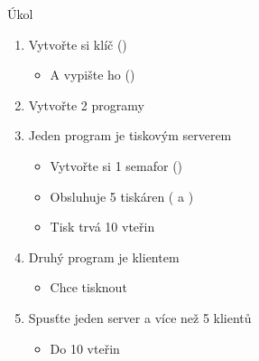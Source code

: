 \begin{frame}{Úkol}

  \begin{enumerate}
    \item Vytvořte si klíč ()
    \begin{itemize}
      \item A vypište ho ()
    \end{itemize}
    \item Vytvořte 2 programy

    \item Jeden program je tiskovým serverem
    \begin{itemize}
      \item Vytvořte si 1 semafor ()
      \item Obsluhuje 5 tiskáren ( a )
      \item Tisk trvá 10 vteřin
    \end{itemize}

    \item Druhý program je klientem
    \begin{itemize}
      \item Chce tisknout
    \end{itemize}

    \item Spusťte jeden server a více než 5 klientů
    \begin{itemize}
      \item Do 10 vteřin
    \end{itemize}
  \end{enumerate}

\end{frame}
